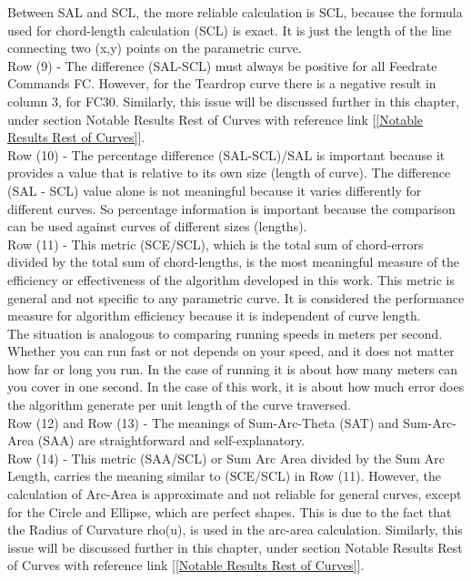 Between SAL and SCL, the more reliable calculation is SCL, because the formula used for chord-length calculation (SCL) is exact. It is just the length of the line connecting two (x,y) points on the parametric curve. \\

Row (9) - The difference (SAL-SCL) must always be positive for all Feedrate Commands FC. However, for the Teardrop curve there is a negative result in column 3, for FC30. Similarly, this issue will be discussed further in this chapter, under section Notable Results Rest of Curves with reference link [\ref{Notable Results Rest of Curves}]. \\

Row (10) - The percentage difference (SAL-SCL)/SAL is important because it provides a value that is relative to its own size (length of curve). The difference (SAL - SCL) value alone is not meaningful because it varies differently for different curves. So percentage information is important because the comparison can be used against curves of different sizes (lengths).\\

Row (11) - This metric (SCE/SCL), which is the total sum of chord-errors divided by the total sum of chord-lengths, is the most meaningful measure of the efficiency or effectiveness of the algorithm developed in this work. This metric is general and not specific to any parametric curve. It is considered the performance measure for algorithm efficiency because it is independent of curve length. \\

The situation is analogous to comparing running speeds in meters per second. Whether you can run fast or not depends on your speed, and it does not matter how far or long you run. In the case of running it is about how many meters can you cover in one second. In the case of this work, it is about how much error does the algorithm generate per unit length of the curve traversed. \\

Row (12) and Row (13) - The meanings of Sum-Arc-Theta (SAT) and Sum-Arc-Area (SAA) are straightforward and self-explanatory. \\

Row (14) - This metric (SAA/SCL) or Sum Arc Area divided by the Sum Arc Length, carries the meaning similar to (SCE/SCL) in Row (11). However, the calculation of Arc-Area is approximate and not reliable for general curves, except for the Circle and Ellipse, which are perfect shapes. This is due to the fact that the Radius of Curvature rho(u), is used in the arc-area calculation. Similarly, this issue will be discussed further in this chapter, under section Notable Results Rest of Curves with reference link [\ref{Notable Results Rest of Curves}].\\

